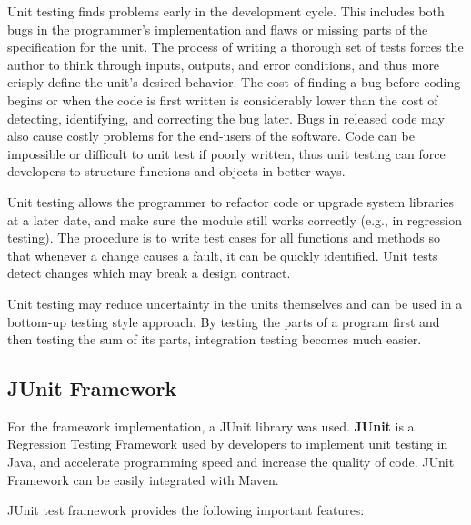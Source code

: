 \documentclass[thesis=M,english,hidelinks]{FITthesis}[2019/12/23]
\begin{document}
Unit testing finds problems early in the development cycle. This includes both bugs in the programmer's implementation and flaws or missing parts of the specification for the unit. The process of writing a thorough set of tests forces the author to think through inputs, outputs, and error conditions, and thus more crisply define the unit's desired behavior. The cost of finding a bug before coding begins or when the code is first written is considerably lower than the cost of detecting, identifying, and correcting the bug later. Bugs in released code may also cause costly problems for the end-users of the software. Code can be impossible or difficult to unit test if poorly written, thus unit testing can force developers to structure functions and objects in better ways.

Unit testing allows the programmer to refactor code or upgrade system libraries at a later date, and make sure the module still works correctly (e.g., in regression testing). The procedure is to write test cases for all functions and methods so that whenever a change causes a fault, it can be quickly identified. Unit tests detect changes which may break a design contract.

Unit testing may reduce uncertainty in the units themselves and can be used in a bottom-up testing style approach. By testing the parts of a program first and then testing the sum of its parts, integration testing becomes much easier.

\subsection{JUnit Framework}

For the framework implementation, a JUnit library was used. \textbf{JUnit} is a Regression Testing Framework used by developers to implement unit testing in Java, and accelerate programming speed and increase the quality of code. JUnit Framework can be easily integrated with Maven.

JUnit test framework provides the following important features:
\end{document}
